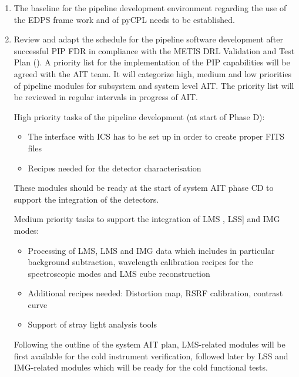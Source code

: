 \begin{enumerate}
    \item The baseline for the pipeline development environment regarding the use of the \ac{EDPS} frame work and of pyCPL needs to be established.
    
    \item Review and adapt the schedule for the pipeline software development after successful PIP FDR in compliance with the METIS DRL Validation and Test Plan (\cite{DRLVT}). A priority list for the implementation of the PIP capabilities will be agreed with the AIT team. It will categorize high, medium and low priorities of pipeline modules for subsystem and system level AIT. The priority list will be reviewed in regular intervals in progress of AIT.
   
    High priority tasks of the pipeline development (at start of Phase D): 
    \begin{itemize}
        \item The interface with ICS has to be set up in order to create proper FITS files 
        \item Recipes needed for the detector characterisation
    \end{itemize} 
    These modules should be ready at the start of system AIT phase CD to support the integration of the detectors.
    
    Medium priority tasks to support the integration of \ac{LMS }, \ac{LSS]} and \ac{IMG} modes:
    \begin{itemize}
        \item Processing of LMS, LMS and IMG data which includes in particular background subtraction, wavelength calibration recipes for the spectroscopic modes and LMS cube reconstruction
        \item Additional recipes needed: Distortion map, RSRF calibration, contrast curve
        \item Support of stray light analysis tools
    \end{itemize}
    Following the outline of the system AIT plan, LMS-related modules will be first available for the cold instrument verification, followed later by LSS and IMG-related modules which will be ready for the cold functional tests.


\end{enumerate}
